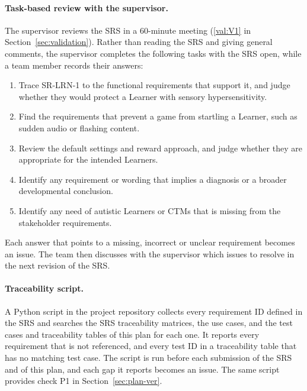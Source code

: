 \documentclass[12pt, titlepage]{article}
\newcounter{validation}
\newcommand{\valref}[1]{\hyperref[val:V#1]{\ref*{val:V#1}}}
\begin{document}
\paragraph{Task-based review with the supervisor.} The supervisor reviews the SRS in a 60-minute meeting (\valref{1} in Section~\ref{sec:validation}). Rather than reading the SRS and giving general comments, the supervisor completes the following tasks with the SRS open, while a team member records their answers:
\begin{enumerate}[label=T\arabic*., nosep]
  \item Trace SR-LRN-1 to the functional requirements that support it, and judge whether they would protect a Learner with sensory hypersensitivity.
  \item Find the requirements that prevent a game from startling a Learner, such as sudden audio or flashing content.
  \item Review the default settings and reward approach, and judge whether they are appropriate for the intended Learners.
  \item Identify any requirement or wording that implies a diagnosis or a broader developmental conclusion.
  \item Identify any need of autistic Learners or CTMs that is missing from the stakeholder requirements.
\end{enumerate}
Each answer that points to a missing, incorrect or unclear requirement becomes an issue. The team then discusses with the supervisor which issues to resolve in the next revision of the SRS.

\paragraph{Traceability script.} A Python script in the project repository collects every requirement ID defined in the SRS and searches the SRS traceability matrices, the use cases, and the test cases and traceability tables of this plan for each one. It reports every requirement that is not referenced, and every test ID in a traceability table that has no matching test case. The script is run before each submission of the SRS and of this plan, and each gap it reports becomes an issue. The same script provides check P1 in Section~\ref{sec:plan-ver}.
\end{document}
